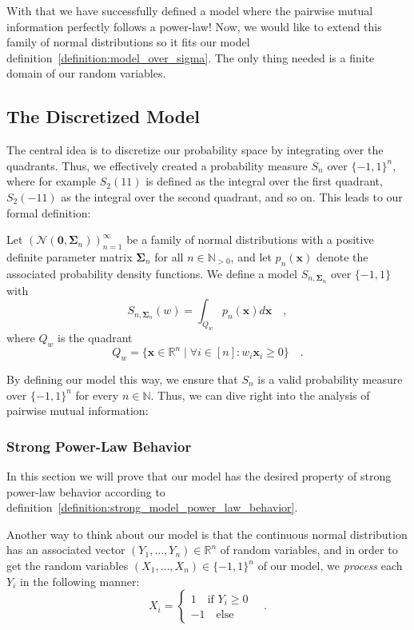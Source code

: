 \documentclass[../../main.tex]{subfiles}
\begin{document}
\bigskip
With that we have successfully defined a model where the pairwise mutual information perfectly follows a power-law! Now, we would like to extend this family of normal distributions so it fits our model definition~\ref{definition:model_over_sigma}. The only thing needed is a finite domain of our random variables.

\subsection{The Discretized Model}
The central idea is to discretize our probability space by integrating over the quadrants. Thus, we effectively created a probability measure $S_n$ over $\{-1, 1\}^n$, where for example $S_2(11)$ is defined as the integral over the first quadrant, $S_2(-11)$ as the integral over the second quadrant, and so on. This leads to our formal definition:

\begin{definition}
    \label{definition:the_model}
    Let $\left(\mathcal{N}(\bm{0}, \bm{\Sigma}_n)\right)_{n=1}^\infty$ be a family of normal distributions with a positive definite parameter matrix $\bm{\Sigma}_n$ for all $n \in \mathbb{N}_{>0}$, and let $p_n(\bm{x})$ denote the associated probability density functions. We define a model $S_{n, \bm{\Sigma}_n}$ over $\{-1, 1\}$ with
    \[
        S_{n, \bm{\Sigma}_n}(w) = \int_{Q_w} p_n(\bm{x}) d\bm{x} \quad ,
    \]
    where $Q_w$ is the quadrant
    \[
        Q_w = \{ \bm{x} \in \mathbb{R}^n \mid \forall i \in [n] : w_i \bm{x}_i \geq 0 \} \quad .
    \]
\end{definition}

By defining our model this way, we ensure that $S_n$ is a valid probability measure over $\{-1, 1\}^n$ for every $n \in \mathbb{N}$. Thus, we can dive right into the analysis of pairwise mutual information:

\subsubsection{Strong Power-Law Behavior}
In this section we will prove that our model has the desired property of strong power-law behavior according to definition~\ref{definition:strong_model_power_law_behavior}.

Another way to think about our model is that the continuous normal distribution has an associated vector $(Y_1, \dots, Y_n) \in \mathbb{R}^n$ of random variables, and in order to get the random variables $(X_1, \dots, X_n) \in \{-1, 1\}^n$ of our model, we \emph{process} each $Y_i$ in the following manner:
\[
    X_i = \begin{cases}
        1 \quad \text{if } Y_i \geq 0 \\
        -1 \quad \text{else}
    \end{cases}
    \quad .
\]
\end{document}
